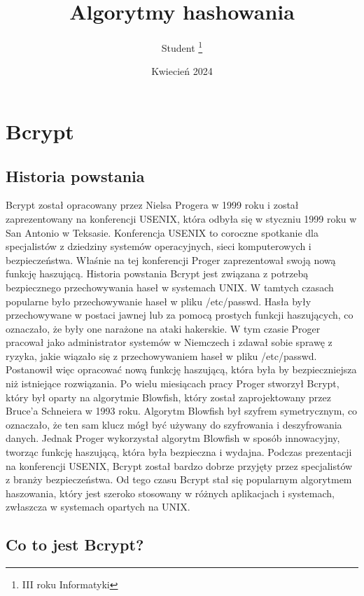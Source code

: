 \documentclass[12pt, a4paper]{article}
\title{Algorytmy hashowania}
\author{Student \thanks{III roku Informatyki}}
\date{Kwiecień 2024}
\begin{document}
\maketitle
\newpage
\section{Bcrypt}
\subsection{Historia powstania}

Bcrypt został opracowany przez Nielsa Progera w 1999 roku i został zaprezentowany na konferencji USENIX, która odbyła się w styczniu 1999 roku w San Antonio w Teksasie. Konferencja USENIX to coroczne spotkanie dla specjalistów z dziedziny systemów operacyjnych, sieci komputerowych i bezpieczeństwa. Właśnie na tej konferencji Proger zaprezentował swoją nową funkcję haszującą.
Historia powstania Bcrypt jest związana z potrzebą bezpiecznego przechowywania haseł w systemach UNIX. W tamtych czasach popularne było przechowywanie haseł w pliku /etc/passwd. Hasła były przechowywane w postaci jawnej lub za pomocą prostych funkcji haszujących, co oznaczało, że były one narażone na ataki hakerskie.
W tym czasie Proger pracował jako administrator systemów w Niemczech i zdawał sobie sprawę z ryzyka, jakie wiązało się z przechowywaniem haseł w pliku /etc/passwd. Postanowił więc opracować nową funkcję haszującą, która była by bezpieczniejsza niż istniejące rozwiązania.
Po wielu miesiącach pracy Proger stworzył Bcrypt, który był oparty na algorytmie Blowfish, który został zaprojektowany przez Bruce'a Schneiera w 1993 roku. Algorytm Blowfish był szyfrem symetrycznym, co oznaczało, że ten sam klucz mógł być używany do szyfrowania i deszyfrowania danych. Jednak Proger wykorzystał algorytm Blowfish w sposób innowacyjny, tworząc funkcję haszującą, która była bezpieczna i wydajna.
Podczas prezentacji na konferencji USENIX, Bcrypt został bardzo dobrze przyjęty przez specjalistów z branży bezpieczeństwa. Od tego czasu Bcrypt stał się popularnym algorytmem haszowania, który jest szeroko stosowany w różnych aplikacjach i systemach, zwłaszcza w systemach opartych na UNIX.

\subsection{Co to jest Bcrypt?}
\end{document}
